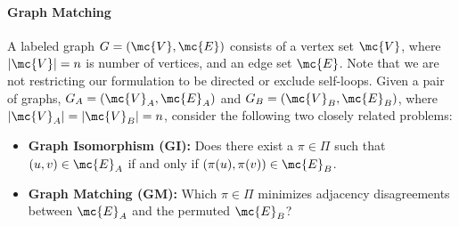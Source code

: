 \documentclass{article} %
\begin{document}
\paragraph{Graph Matching} %
\label{sec:GM}




A labeled graph $G=(\mc{V},\mc{E})$ consists of a vertex set $\mc{V}$, where $|\mc{V}|=n$ is number of vertices, and an edge set $\mc{E}$. %
Note that we are not restricting our formulation to be directed or exclude self-loops. Given a pair of graphs, $G_A=(\mc{V}_A,\mc{E}_A)$ and $G_B=(\mc{V}_B,\mc{E}_B)$, where $|\mc{V}_A|=|\mc{V}_B|=n$, 
consider the following two closely related problems:
\begin{itemize}
	\item \textbf{Graph Isomorphism (GI):}  Does there exist a $\pi \in \Pi$ such that $(u,v) \in \mc{E}_A$ if and only if $(\pi(u),\pi(v)) \in \mc{E}_B$. 
		\item \textbf{Graph Matching (GM):}
		 Which $\pi \in \Pi$ minimizes adjacency disagreements between $\mc{E}_A$ and the permuted $\mc{E}_B$?
\end{itemize}
\end{document}
